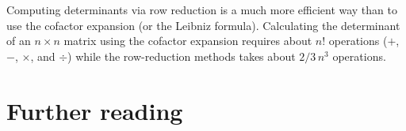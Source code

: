 \documentclass{ximera}
\begin{document}
\begin{example}
\begin{explanation}
  \end{explanation}
\end{example}

\begin{remark}
  Computing determinants via row reduction is a much more efficient
  way than to use the cofactor expansion (or the Leibniz
  formula). Calculating the determinant of an $n \times n$ matrix using the
  cofactor expansion requires about $n!$ operations ($+$, $-$, $\times$, and $\div$) while the
  row-reduction methods takes about $2/3\, n^3$ operations.

\end{remark}





\section{Further reading}
\end{document}
